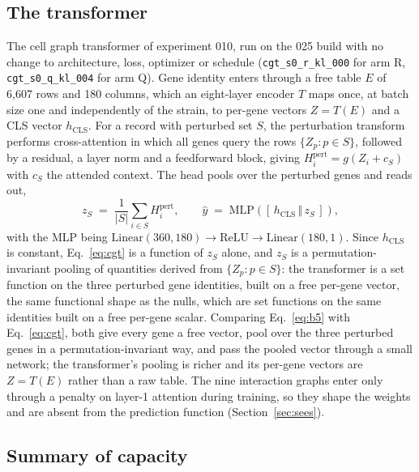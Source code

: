 \subsection{The transformer}
\label{sec:cgt}

The cell graph transformer of experiment 010, run on the 025 build with no change
to architecture, loss, optimizer or schedule (\texttt{cgt\_s0\_r\_kl\_000} for arm
R, \texttt{cgt\_s0\_q\_kl\_004} for arm Q). Gene identity enters through a free
table $E$ of 6{,}607 rows and 180 columns, which an eight-layer encoder $T$ maps
once, at batch size one and independently of the strain, to per-gene vectors
$Z = T(E)$ and a CLS vector $h_{\mathrm{CLS}}$. For a record with perturbed set $S$,
the perturbation transform performs cross-attention in which all genes query the
rows $\{Z_p : p \in S\}$, followed by a residual, a layer norm and a feedforward
block, giving $H^{\mathrm{pert}}_i = g(Z_i + c_S)$ with $c_S$ the attended context.
The head pools over the perturbed genes and reads out,
%
\begin{equation}
  z_S \;=\; \frac{1}{|S|}\sum_{i \in S} H^{\mathrm{pert}}_i ,
  \qquad
  \hat{y} \;=\; \mathrm{MLP}\!\left([\,h_{\mathrm{CLS}} \,\Vert\, z_S\,]\right),
  \label{eq:cgt}
\end{equation}
%
with the MLP being $\mathrm{Linear}(360, 180) \to \mathrm{ReLU} \to
\mathrm{Linear}(180, 1)$. Since $h_{\mathrm{CLS}}$ is constant, Eq.~\ref{eq:cgt} is
a function of $z_S$ alone, and $z_S$ is a permutation-invariant pooling of
quantities derived from $\{Z_p : p \in S\}$: the transformer is a set function on
the three perturbed gene identities, built on a free per-gene vector, the same
functional shape as the nulls, which are set functions on the same identities built
on a free per-gene scalar. Comparing Eq.~\ref{eq:b5} with Eq.~\ref{eq:cgt}, both
give every gene a free vector, pool over the three perturbed genes in a
permutation-invariant way, and pass the pooled vector through a small network; the
transformer's pooling is richer and its per-gene vectors are $Z = T(E)$ rather than
a raw table. The nine interaction graphs enter only through a penalty on layer-1
attention during training, so they shape the weights and are absent from the
prediction function\iflong{} (Section~\ref{sec:sees})\fi.

\subsection{Summary of capacity}

